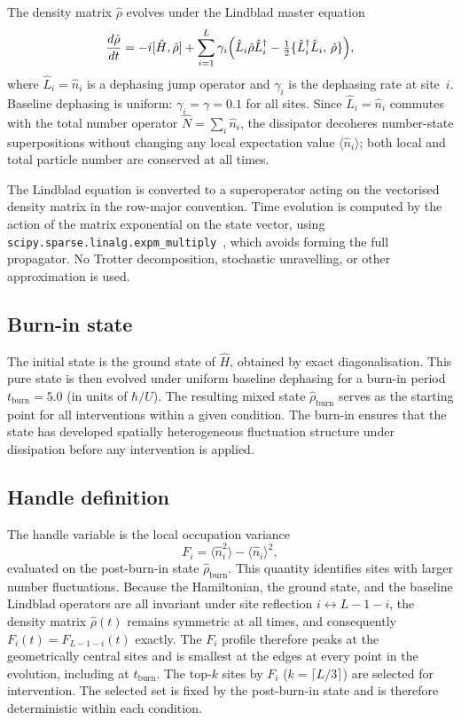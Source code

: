 \documentclass[aps,pra,reprint,amsmath,amssymb,longbibliography,floatfix]{revtex4-2}
\newcommand{\Fi}{F_i}
\newcommand{\nop}{\hat{n}}
\newcommand{\rhohat}{\hat{\rho}}
\newcommand{\Lop}{\hat{L}}
\begin{document}
The density matrix $\rhohat$ evolves under the Lindblad master equation
\begin{equation}
\label{eq:lindblad}
\frac{d\rhohat}{dt} = -i[\hat{H},\rhohat]
  + \sum_{i=1}^{L} \gamma_i \Bigl(
    \Lop_i\rhohat\Lop_i^\dagger
    - \tfrac{1}{2}\{\Lop_i^\dagger\Lop_i,\,\rhohat\}
  \Bigr),
\end{equation}
where $\Lop_i = \nop_i$ is a dephasing jump operator and $\gamma_i$ is
the dephasing rate at site~$i$.
Baseline dephasing is uniform: $\gamma_i = \gamma = 0.1$ for all sites.
Since $\Lop_i = \nop_i$ commutes with the total number operator $\hat{N} =
\sum_i \nop_i$, the dissipator decoheres number-state superpositions without
changing any local expectation value $\langle\nop_i\rangle$; both local and
total particle number are conserved at all times.

The Lindblad equation is converted to a superoperator acting on the
vectorised density matrix in the row-major convention.
Time evolution is computed by the action of the matrix exponential on
the state vector, using \texttt{scipy.sparse.linalg.expm\_multiply}~\cite{scipy2020},
which avoids forming the full propagator.
No Trotter decomposition, stochastic unravelling, or other approximation
is used.

\subsection{Burn-in state}

The initial state is the ground state of $\hat{H}$, obtained by exact
diagonalisation.
This pure state is then evolved under uniform baseline dephasing for a
burn-in period $t_{\mathrm{burn}}=5.0$ (in units of $\hbar/U$).
The resulting mixed state $\rhohat_{\mathrm{burn}}$ serves as the starting
point for all interventions within a given condition.
The burn-in ensures that the state has developed spatially heterogeneous
fluctuation structure under dissipation before any intervention is applied.

\subsection{Handle definition}

The handle variable is the local occupation variance
\begin{equation}
\label{eq:Fi}
\Fi = \langle\nop_i^2\rangle - \langle\nop_i\rangle^2,
\end{equation}
evaluated on the post-burn-in state $\rhohat_{\mathrm{burn}}$.
This quantity identifies sites with larger number fluctuations.
Because the Hamiltonian, the ground state, and the baseline Lindblad
operators are all invariant under site reflection $i\leftrightarrow L-1-i$,
the density matrix $\rhohat(t)$ remains symmetric at all times, and
consequently $\Fi(t) = F_{L-1-i}(t)$ exactly.
The $\Fi$ profile therefore peaks at the geometrically central sites and
is smallest at the edges at every point in the evolution, including at
$t_{\mathrm{burn}}$.
The top-$k$ sites by $\Fi$ ($k=\lceil L/3\rceil$) are selected for
intervention.
The selected set is fixed by the post-burn-in state and is therefore
deterministic within each condition.
\end{document}
